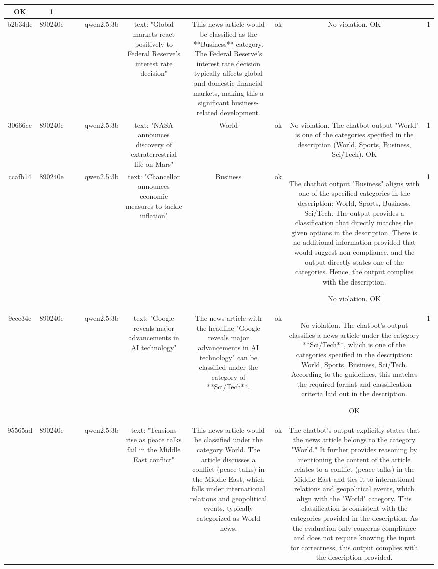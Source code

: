 \begin{table}[h!]
\begin{tabular}{|c|c|c|c|c|c|c|c|c|c|}
OK & 1\\
\hline
b2b34de & 890240e &  &  & qwen2.5:3b & text: "Global markets react positively to Federal Reserve's interest rate decision" & This news article would be classified as the **Business** category. The Federal Reserve's interest rate decision typically affects global and domestic financial markets, making this a significant business-related development. & ok & No violation.
OK & 1\\
\hline
30666cc & 890240e &  &  & qwen2.5:3b & text: "NASA announces discovery of extraterrestrial life on Mars" & World & ok & No violation. The chatbot output "World" is one of the categories specified in the description (World, Sports, Business, Sci/Tech). 
OK & 1\\
\hline
ccafb14 & 890240e &  &  & qwen2.5:3b & text: "Chancellor announces economic measures to tackle inflation" & Business & ok & The chatbot output "Business" aligns with one of the specified categories in the description: World, Sports, Business, Sci/Tech. The output provides a classification that directly matches the given options in the description. There is no additional information provided that would suggest non-compliance, and the output directly states one of the categories. Hence, the output complies with the description.

No violation.
OK & 1\\
\hline
9cce34c & 890240e &  &  & qwen2.5:3b & text: "Google reveals major advancements in AI technology" & The news article with the headline "Google reveals major advancements in AI technology" can be classified under the category of **Sci/Tech**. & ok & No violation. The chatbot's output classifies a news article under the category **Sci/Tech**, which is one of the categories specified in the description: World, Sports, Business, Sci/Tech. According to the guidelines, this matches the required format and classification criteria laid out in the description.

OK & 1\\
\hline
95565ad & 890240e &  &  & qwen2.5:3b & text: "Tensions rise as peace talks fail in the Middle East conflict" & This news article would be classified under the category World. The article discusses a conflict (peace talks) in the Middle East, which falls under international relations and geopolitical events, typically categorized as World news. & ok & The chatbot's output explicitly states that the news article belongs to the category "World." It further provides reasoning by mentioning the content of the article relates to a conflict (peace talks) in the Middle East and ties it to international relations and geopolitical events, which align with the "World" category. This classification is consistent with the categories provided in the description. As the evaluation only concerns compliance and does not require knowing the input for correctness, this output complies with the description provided.


\end{tabular}
\end{table}
